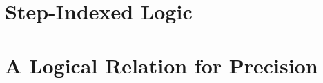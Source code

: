 \begin{code}%
\>[0]\AgdaSpace{}%
\AgdaSymbol{:}\AgdaSpace{}%
\AgdaSymbol{(}\AgdaSpace{}%
\AgdaSpace{}%
\AgdaSymbol{:}\AgdaSpace{}%
\AgdaSymbol{)}\AgdaSpace{}%
\AgdaSpace{}%
\<%
\\
\>[0]\AgdaSpace{}%
\AgdaSpace{}%
\AgdaSpace{}%
\AgdaSymbol{=}\AgdaSpace{}%
\AgdaSymbol{(}\AgdaSpace{}%
\AgdaSpace{}%
\AgdaSpace{}%
\AgdaSpace{}%
\AgdaSymbol{)}\AgdaSpace{}%
\AgdaSpace{}%
\AgdaSymbol{(}\AgdaSpace{}%
\AgdaSpace{}%
\AgdaSpace{}%
\AgdaSpace{}%
\AgdaSymbol{)}\<%
\\
\>[0][@{}l@{\AgdaIndent{0}}]%
\>[4]\AgdaSpace{}%
\AgdaSymbol{(}\AgdaSpace{}%
\AgdaSpace{}%
\AgdaSpace{}%
\AgdaSpace{}%
\AgdaSpace{}%
\AgdaSpace{}%
\AgdaSpace{}%
\AgdaSpace{}%
\AgdaSymbol{)}\AgdaSpace{}%
\AgdaSpace{}%
\AgdaSymbol{(}\AgdaSpace{}%
\AgdaSpace{}%
\AgdaSpace{}%
\AgdaSpace{}%
\AgdaSymbol{)}\AgdaSpace{}%
\AgdaSpace{}%
\AgdaSymbol{(}\AgdaSpace{}%
\AgdaSpace{}%
\AgdaSpace{}%
\AgdaSpace{}%
\AgdaSpace{}%
\AgdaSpace{}%
\AgdaSymbol{)}\<%
\end{code}

\clearpage
\section{Step-Indexed Logic}



\section{A Logical Relation for Precision}


